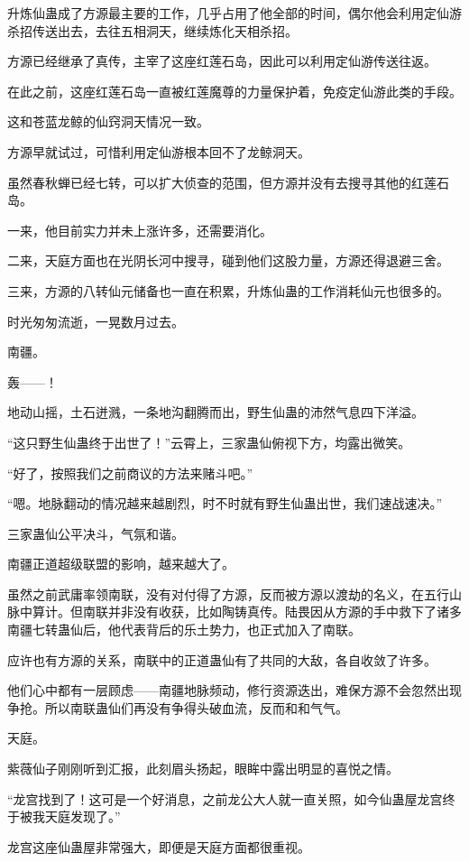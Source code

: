 \begin{this_body}
升炼仙蛊成了方源最主要的工作，几乎占用了他全部的时间，偶尔他会利用定仙游杀招传送出去，去往五相洞天，继续炼化天相杀招。

方源已经继承了真传，主宰了这座红莲石岛，因此可以利用定仙游传送往返。

在此之前，这座红莲石岛一直被红莲魔尊的力量保护着，免疫定仙游此类的手段。

这和苍蓝龙鲸的仙窍洞天情况一致。

方源早就试过，可惜利用定仙游根本回不了龙鲸洞天。

虽然春秋蝉已经七转，可以扩大侦查的范围，但方源并没有去搜寻其他的红莲石岛。

一来，他目前实力并未上涨许多，还需要消化。

二来，天庭方面也在光阴长河中搜寻，碰到他们这股力量，方源还得退避三舍。

三来，方源的八转仙元储备也一直在积累，升炼仙蛊的工作消耗仙元也很多的。

时光匆匆流逝，一晃数月过去。

南疆。

轰——！

地动山摇，土石迸溅，一条地沟翻腾而出，野生仙蛊的沛然气息四下洋溢。

“这只野生仙蛊终于出世了！”云霄上，三家蛊仙俯视下方，均露出微笑。

“好了，按照我们之前商议的方法来赌斗吧。”

“嗯。地脉翻动的情况越来越剧烈，时不时就有野生仙蛊出世，我们速战速决。”

三家蛊仙公平决斗，气氛和谐。

南疆正道超级联盟的影响，越来越大了。

虽然之前武庸率领南联，没有对付得了方源，反而被方源以渡劫的名义，在五行山脉中算计。但南联并非没有收获，比如陶铸真传。陆畏因从方源的手中救下了诸多南疆七转蛊仙后，他代表背后的乐土势力，也正式加入了南联。

应许也有方源的关系，南联中的正道蛊仙有了共同的大敌，各自收敛了许多。

他们心中都有一层顾虑——南疆地脉频动，修行资源迭出，难保方源不会忽然出现争抢。所以南联蛊仙们再没有争得头破血流，反而和和气气。

天庭。

紫薇仙子刚刚听到汇报，此刻眉头扬起，眼眸中露出明显的喜悦之情。

“龙宫找到了！这可是一个好消息，之前龙公大人就一直关照，如今仙蛊屋龙宫终于被我天庭发现了。”

龙宫这座仙蛊屋非常强大，即便是天庭方面都很重视。


\end{this_body}

